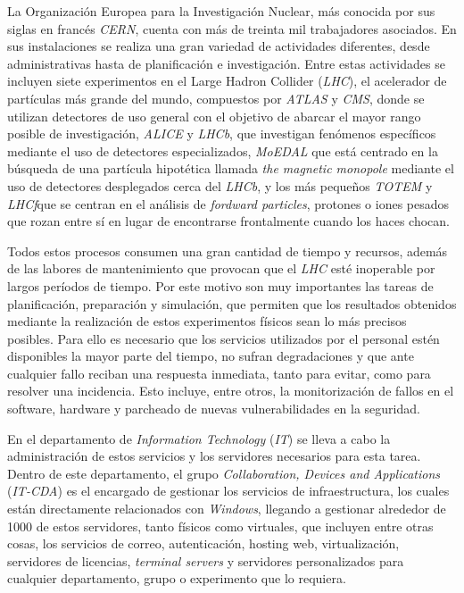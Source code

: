 \label{sec:int}


La Organización Europea para la Investigación Nuclear, más conocida por sus siglas en francés \textit{CERN}, cuenta con más de treinta mil trabajadores asociados. En sus instalaciones se realiza una gran variedad de actividades diferentes, desde administrativas hasta de planificación e investigación. Entre estas actividades se incluyen siete experimentos en el Large Hadron Collider (\textit{LHC}), el acelerador de partículas más grande del mundo, compuestos por \textit{ATLAS} y \textit{CMS}, donde se utilizan detectores de uso general con el objetivo de abarcar el mayor rango posible de investigación, \textit{ALICE} y \textit{LHCb}, que investigan fenómenos específicos mediante el uso de detectores especializados, \textit{MoEDAL} que está centrado en la búsqueda de una partícula hipotética llamada \textit{the magnetic monopole} mediante el uso de detectores desplegados cerca del \textit{LHCb}, y los más pequeños \textit{TOTEM} y \textit{LHCf}que se centran en el análisis de \textit{fordward particles}, protones o iones pesados que rozan entre sí en lugar de encontrarse frontalmente cuando los haces chocan. \cite{lhc}

Todos estos procesos consumen una gran cantidad de tiempo y recursos, además de las labores de mantenimiento que provocan que el \textit{LHC} esté inoperable por largos períodos de tiempo. Por este motivo son muy importantes las tareas de planificación, preparación y simulación, que permiten que los resultados obtenidos mediante la realización de estos experimentos físicos sean lo más precisos posibles. Para ello es necesario que los servicios utilizados por el personal estén disponibles la mayor parte del tiempo, no sufran degradaciones y que ante cualquier fallo reciban una respuesta inmediata, tanto para evitar, como para resolver una incidencia. Esto incluye, entre otros, la monitorización de fallos en el software, hardware y parcheado de nuevas vulnerabilidades en la seguridad.

En el departamento de \textit{Information Technology} (\textit{IT}) se lleva a cabo la administración de estos servicios y los servidores necesarios para esta tarea. Dentro de este departamento, el grupo \textit{Collaboration, Devices and Applications} (\textit{IT-CDA}) es el encargado de gestionar los servicios de infraestructura, los cuales están directamente relacionados con \textit{Windows}, llegando a gestionar alrededor de 1000 de estos servidores, tanto físicos como virtuales, que incluyen entre otras cosas, los servicios de correo, autenticación, hosting web, virtualización, servidores de licencias, \textit{terminal servers} y servidores personalizados para cualquier departamento, grupo o experimento que lo requiera. \cite{infraservicios,infrawindows}

